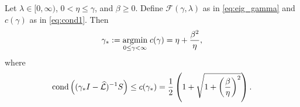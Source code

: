\documentclass[review]{siamart}
\begin{document}
%
\begin{theorem}\label{th:eig}
Let $\lambda\in[0,\infty)$, $0<\eta\leq \gamma$, and $\beta \geq 0$.
Define $\mathcal{F}(\gamma,\lambda)$ as in \eqref{eq:eig_gamma} and
$c(\gamma)$ as in \eqref{eq:cond1}. Then 
\begin{align}\label{eq:gammastar}
\gamma_*  :=  \underset{0 \leq \gamma < \infty}{\textnormal{argmin}} \; c(\gamma)
	= \eta + \frac{\beta^2}{\eta},
\end{align}
where
\begin{align} \label{eq:cond_min}
\textnormal{cond}\left((\gamma_* I- \widehat{\mathcal{L}})^{-1}S\right) \leq
	c(\gamma_*) = \frac{1}{2} \left( 1 + \sqrt{1 + \left( \frac{\beta}{\eta} \right)^2} \right).
\end{align}

\end{theorem}
\end{document}
